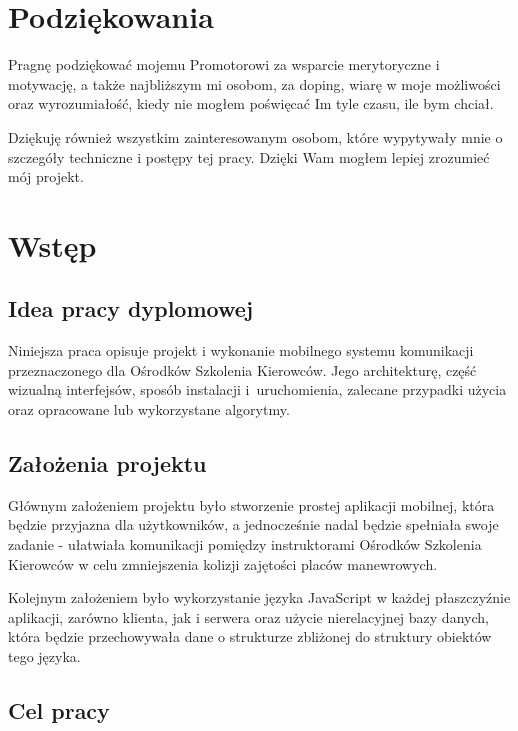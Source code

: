\documentclass[twoside,a4paper]{book}
\begin{document}
\frontmatter
\tableofcontents


\chapter*{Podziękowania}
Pragnę podziękować mojemu Promotorowi za wsparcie merytoryczne i motywację, a także najbliższym mi osobom, za doping, wiarę w moje możliwości oraz wyrozumiałość, kiedy nie mogłem poświęcać Im tyle czasu, ile bym chciał.

Dziękuję również wszystkim zainteresowanym osobom, które wypytywały mnie o szczegóły techniczne i postępy tej pracy. Dzięki Wam mogłem lepiej zrozumieć mój projekt.


\mainmatter

\chapter{Wstęp}
\section{Idea pracy dyplomowej}

Niniejsza praca opisuje projekt i wykonanie mobilnego systemu komunikacji przeznaczonego dla Ośrodków Szkolenia Kierowców. Jego architekturę, część wizualną interfejsów, sposób instalacji i~uruchomienia, zalecane przypadki użycia oraz opracowane lub wykorzystane algorytmy.


\section{Założenia projektu}

Głównym założeniem projektu było stworzenie prostej aplikacji mobilnej, która będzie przyjazna dla użytkowników, a jednocześnie nadal będzie spełniała swoje zadanie - ułatwiała komunikacji pomiędzy instruktorami Ośrodków Szkolenia Kierowców w celu zmniejszenia kolizji zajętości placów manewrowych.

Kolejnym założeniem było wykorzystanie języka JavaScript w każdej płaszczyźnie aplikacji, zarówno klienta, jak i serwera oraz użycie nierelacyjnej bazy danych, która będzie przechowywała dane o strukturze zbliżonej do struktury obiektów tego języka.


\section{Cel pracy}
\end{document}
